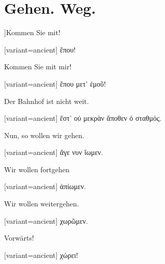 \section{Gehen. Weg.}

]\indent Kommen Sie mit!

\switchcolumn

\begin{greek}[variant=ancient]%
ἕπου!

\end{greek}%
\switchcolumn*

Kommen Sie mit mir!

\switchcolumn

\begin{greek}[variant=ancient]%
ἕπου μετ' ἐμοῦ!

\end{greek}%
\switchcolumn*

Der Bahnhof ist nicht weit.

\switchcolumn

\begin{greek}[variant=ancient]%
ἔστ' οὐ μεκρὰν ἄποθεν ὁ σταθμός.

\end{greek}%
\switchcolumn*

Nun, so wollen wir gehen.

\switchcolumn

\begin{greek}[variant=ancient]%
ἄγε νυν ἴωμεν.

\end{greek}%
\switchcolumn*

Wir wollen fortgehen

\switchcolumn

\begin{greek}[variant=ancient]%
ἀπίωμεν.

\end{greek}%
\switchcolumn*

Wir wollen weitergehen.

\switchcolumn

\begin{greek}[variant=ancient]%
χωρῶμεν.

\end{greek}%
\switchcolumn*

Vorwärts!

\switchcolumn

\begin{greek}[variant=ancient]%
χώρει!

\end{greek}%
\switchcolumn*

